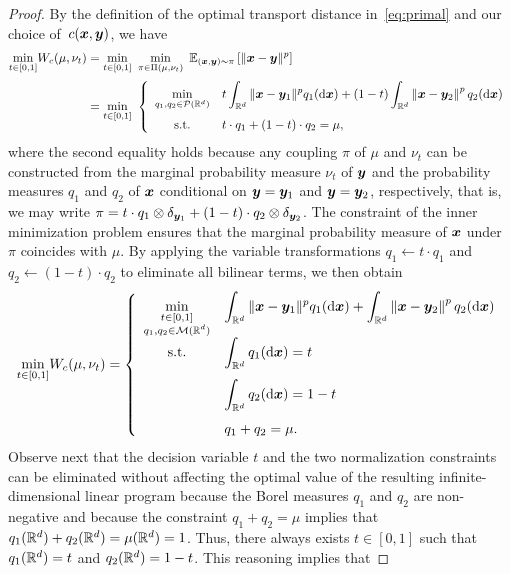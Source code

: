 \documentclass[11pt, a4paper, oneside, reqno]{article}
\begin{document}
	\begin{proof}
		By the definition of the optimal transport distance in~\eqref{eq:primal} and our choice of~$c(\boldsymbol x, \boldsymbol y)$, we have
		\begin{align*}
		\underset{ t  \in [0,1]}{\min}W_c(\mu,  {\nu}_ t )&= \underset{ t  \in [0,1]}{\min} ~ \min\limits_{\pi \in \Pi(\mu,\nu_t)} ~ \mathbb{E}_{(\boldsymbol x, \boldsymbol y)\sim\pi}\left[\|\boldsymbol x- \boldsymbol y \|^p \right] \\[0.5ex] &=\min\limits_{ t  \in [0,1]}~ \left\{\begin{array}{cl} \min\limits_{q_1, q_2 \in \mathcal{P}(\mathbb{R}^d)}& t \displaystyle\int_{\mathbb{R}^d} \|\boldsymbol x-\boldsymbol y_1\|^p q_1(\mathrm{d} \boldsymbol x) + (1-t) \displaystyle\int_{\mathbb{R}^d}\left \|\boldsymbol x-\boldsymbol y_2 \right\|^p q_2(\mathrm{d} \boldsymbol x)\\ [3ex]
		\textrm{s.t.}& t \cdot  q_1 + (1-t) \cdot q_2 = \mu,
		\end{array}\right.
		\end{align*}
		where the second equality holds because any coupling $\pi$ of $\mu$ and $\nu_t$ can be constructed from the marginal probability measure $\nu_t$ of $\boldsymbol y$ and the probability measures $q_1$ and $q_2$ of $\boldsymbol x$ conditional on $\boldsymbol y =\boldsymbol y_1$ and $\boldsymbol y = \boldsymbol y_2$, respectively, that is, we may write $\pi= t\cdot q_1\otimes \delta_{\boldsymbol y_1} + (1-t)\cdot q_2\otimes \delta_{\boldsymbol y_2}$. The constraint of the inner minimization problem ensures that the marginal probability measure of $\boldsymbol x$ under $\pi$ coincides with $\mu$. By applying the variable transformations $q_1\leftarrow t \cdot q_1 $ and $q_2 \leftarrow (1-t)\cdot q_2$ to eliminate all bilinear terms, we then obtain
		\begin{equation*}
		\underset{ t  \in [0,1]}{\min}W_c(\mu,  {\nu}_ t )=\left\{\begin{array}{cll}
		\underset{\substack{ t \in [0,1] \\ q_1, q_2 \in \mathcal{M}(\mathbb{R}^d)}}{\min} &\displaystyle\int_{\mathbb{R}^d} \|\boldsymbol x -\boldsymbol y_1\|^p q_1(\mathrm{d} \boldsymbol x) + \displaystyle\int_{\mathbb{R}^d} \left\|\boldsymbol x-\boldsymbol y_2 \right\|^p  q_2(\mathrm{d} \boldsymbol x)\\[3ex]
		\textrm{s.t.} &\displaystyle\int_{\mathbb{R}^d} q_1(\mathrm{d} \boldsymbol x) =  t  \\[3ex]
		&\displaystyle\int_{\mathbb{R}^d} q_2(\mathrm{d} \boldsymbol x) = 1-  t  \\[3ex]
		&  q_1 +  q_2 = \mu.
		\end{array}\right.
		\end{equation*}
		Observe next that the decision variable $t$ and the two normalization constraints can be eliminated without affecting the optimal value of the resulting infinite-dimensional linear program because the Borel measures $q_1$ and $q_2$ are non-negative and because the constraint $q_1+q_2=\mu$ implies that $q_1(\mathbb{R}^d)+q_2(\mathbb{R}^d)=\mu(\mathbb{R}^d)=1$. Thus, there always exists $t\in[0,1]$ such that $q_1(\mathbb{R}^d)=t$ and $q_2(\mathbb{R}^d)=1-t$. This reasoning implies that

\end{proof}
\end{document}
